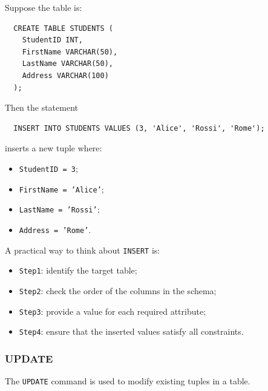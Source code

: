  \begin{example}
  Suppose the table is:
  \begin{verbatim}
  CREATE TABLE STUDENTS (
    StudentID INT,
    FirstName VARCHAR(50),
    LastName VARCHAR(50),
    Address VARCHAR(100)
  );
  \end{verbatim}
  \vspace{-0.4cm}

  Then the statement
  \begin{verbatim}
  INSERT INTO STUDENTS VALUES (3, 'Alice', 'Rossi', 'Rome');
  \end{verbatim}
  \vspace{-0.4cm}

  inserts a new tuple where:
  \begin{itemize}
   \item \texttt{StudentID = 3};
   \vspace{0.2cm}
   \item \texttt{FirstName = 'Alice'};
   \vspace{0.2cm}
   \item \texttt{LastName = 'Rossi'};
   \vspace{0.2cm}
   \item \texttt{Address = 'Rome'}.
  \end{itemize}



  A practical way to think about \texttt{INSERT} is:
  \begin{itemize}
   \item \texttt{Step1}: identify the target table;

   \item \texttt{Step2}: check the order of the columns in the schema;

   \item \texttt{Step3}: provide a value for each required attribute;

   \item \texttt{Step4}: ensure that the inserted values satisfy all constraints.
  \end{itemize}

   \end{example}

 \subsubsection{UPDATE}

 The \texttt{UPDATE} command is used to modify existing tuples in a table.

